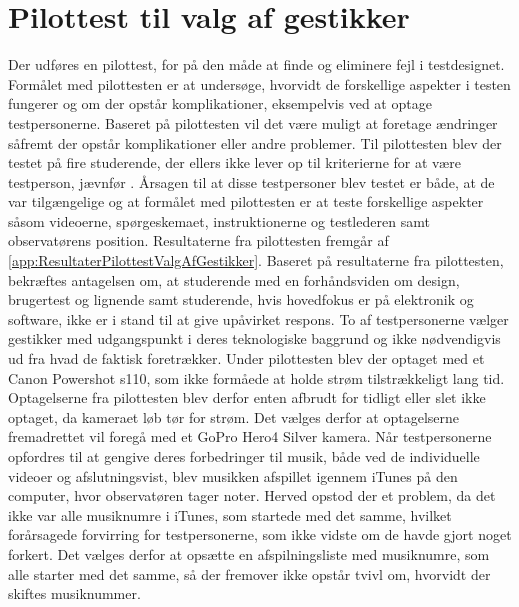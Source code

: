 \section{Pilottest til valg af gestikker}
\label{PilottestValgAfGestikker}
%
Der udføres en pilottest, for på den måde at finde og eliminere fejl i testdesignet. Formålet med pilottesten er at undersøge, hvorvidt de forskellige aspekter i testen fungerer og om der opstår komplikationer, eksempelvis ved at optage testpersonerne. Baseret på pilottesten vil det være muligt at foretage ændringer såfremt der opstår komplikationer eller andre problemer.\blankline
%  
Til pilottesten blev der testet på fire studerende, der ellers ikke lever op til kriterierne for at være testperson, jævnfør . Årsagen til at disse testpersoner blev testet er både, at de var tilgængelige og at formålet med pilottesten er at teste forskellige aspekter såsom videoerne, spørgeskemaet, instruktionerne og testlederen samt observatørens position. Resultaterne fra pilottesten fremgår af \autoref{app:ResultaterPilottestValgAfGestikker}. Baseret på resultaterne fra pilottesten, bekræftes antagelsen om, at studerende med en forhåndsviden om design, brugertest og lignende samt studerende, hvis hovedfokus er på elektronik og software, ikke er i stand til at give upåvirket respons. To af testpersonerne vælger gestikker med udgangspunkt i deres teknologiske baggrund og ikke nødvendigvis ud fra hvad de faktisk foretrækker.\blankline
% 
Under pilottesten blev der optaget med et Canon Powershot s110, som ikke formåede at holde strøm tilstrækkeligt lang tid. Optagelserne fra pilottesten blev derfor enten afbrudt for tidligt eller slet ikke optaget, da kameraet løb tør for strøm. Det vælges derfor at optagelserne fremadrettet vil foregå med et GoPro Hero4 Silver kamera.\blankline
% 
Når testpersonerne opfordres til at gengive deres forbedringer til musik, både ved de individuelle videoer og afslutningsvist, blev musikken afspillet igennem iTunes på den computer, hvor observatøren tager noter. Herved opstod der et problem, da det ikke var alle musiknumre i iTunes, som startede med det samme, hvilket forårsagede forvirring for testpersonerne, som ikke vidste om de havde gjort noget forkert. Det vælges derfor at opsætte en afspilningsliste med musiknumre, som alle starter med det samme, så der fremover ikke opstår tvivl om, hvorvidt der skiftes musiknummer. 

